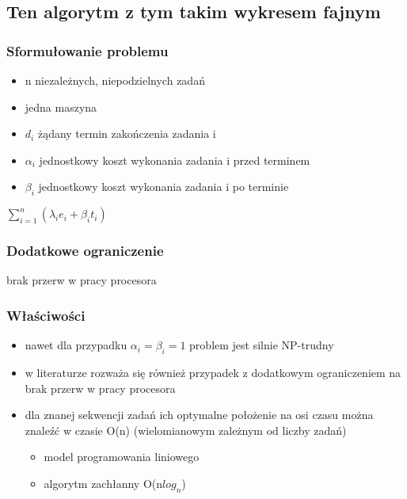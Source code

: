 \documentclass[12pt,a4paper]{article}
\begin{document}
\subsection{Ten algorytm z tym takim wykresem fajnym}
\subsubsection{Sformułowanie problemu}
\begin{itemize}
\item n niezależnych, niepodzielnych zadań
\item jedna maszyna
\item $d_{i}$ żądany termin zakończenia zadania i
\item $\alpha_{i}$ jednostkowy koszt wykonania zadania i przed terminem
\item $\beta_{i}$ jednostkowy koszt wykonania zadania i po terminie
\end{itemize}
$\sum\limits_{i=1}^{n}(\lambda_{i}e_{i}+\beta_{i}t_{i})$
\subsubsection{Dodatkowe ograniczenie}
brak przerw w pracy procesora
\subsubsection{Właściwości}
\begin{itemize}
\item nawet dla przypadku $\alpha_{i}=\beta_{i}=1$ problem jest silnie NP-trudny
\item w literaturze rozważa się również przypadek z dodatkowym ograniczeniem na brak przerw w pracy procesora
\item dla znanej sekwencji zadań ich optymalne położenie na osi czasu można znaleźć w czasie O(n) (wielomianowym zależnym od liczby zadań)\begin{itemize}
\item model programowania liniowego
\item algorytm zachłanny O(n$log_{n}$)
\end{itemize}
\end{itemize}
\end{document}

